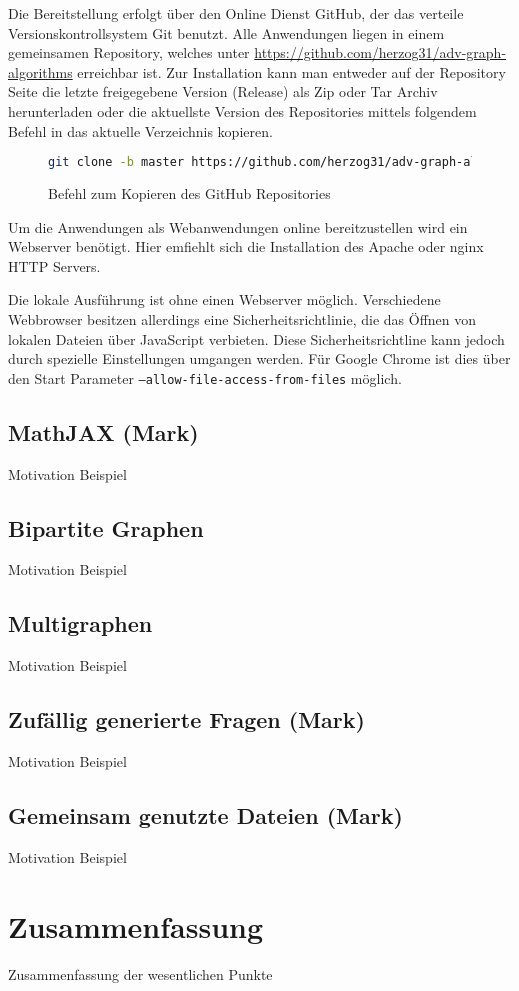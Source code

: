 Die Bereitstellung erfolgt über den Online Dienst GitHub, der das verteile Versionskontrollsystem Git benutzt. 
Alle Anwendungen liegen in einem gemeinsamen Repository, welches unter \url{https://github.com/herzog31/adv-graph-algorithms} erreichbar ist. Zur Installation kann man entweder auf der Repository Seite die letzte freigegebene Version (Release) als Zip oder Tar Archiv herunterladen oder die aktuellste Version des Repositories mittels folgendem Befehl in das aktuelle Verzeichnis kopieren.

\begin{figure}[htb]
	\begin{lstlisting}[language=Bash]
    git clone -b master https://github.com/herzog31/adv-graph-algorithms.git
  	\end{lstlisting}
  	\caption[Repository Kopieren]{Befehl zum Kopieren des GitHub Repositories}\label{fig:sample-listing}
\end{figure}

Um die Anwendungen als Webanwendungen online bereitzustellen wird ein Webserver benötigt. Hier emfiehlt sich die Installation des Apache oder nginx  HTTP Servers.

Die lokale Ausführung ist ohne einen Webserver möglich. Verschiedene Webbrowser besitzen allerdings eine Sicherheitsrichtlinie, die das Öffnen von lokalen Dateien über JavaScript verbieten. Diese Sicherheitsrichtline kann jedoch durch spezielle Einstellungen umgangen werden. Für Google Chrome ist dies über den Start Parameter \texttt{--allow-file-access-from-files} möglich.

\section{MathJAX (Mark)}
Motivation
Beispiel

\section{Bipartite Graphen}
Motivation
Beispiel

\section{Multigraphen}
Motivation
Beispiel

\section{Zufällig generierte Fragen (Mark)}
Motivation
Beispiel

\section{Gemeinsam genutzte Dateien (Mark)}
Motivation
Beispiel

\chapter{Zusammenfassung}
Zusammenfassung der wesentlichen Punkte